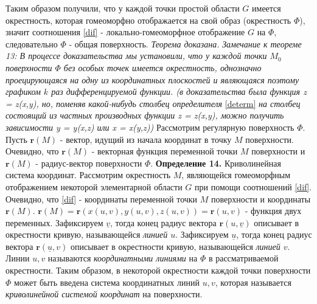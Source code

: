 \documentclass[12pt,a4paper]{article}
\begin{document}
	Таким образом получили, что у каждой точки простой области $G$ имеется окрестность, которая гомеоморфно отображается на свой образ (окрестность $\Phi$), значит соотношения \eqref{dif} - локально-гомеоморфное отображение $G$ на $\Phi$, следовательно $\Phi$ - общая поверхность. \textit{Теорема доказана.}
	\newline
	\newline
	\textit{Замечание к теореме 13: В процессе доказательства мы установили, что у каждой точки $M_{0}$ поверхности $\Phi$ без особых точек имеется окрестность, однозначно проецирующаяся на одну из координатных плоскостей и являющаяся поэтому графиком $k$ раз дифференцируемой функции. (в доказательства была функция z = z(x,y), но, поменяв какой-нибудь столбец определителя} \eqref{determ} \textit{на столбец состоящий из частных производных функции z = z(x,y), можно получить зависимости y = y(x,z) или x = x(y,z))}
	\newline
	\newline
	Рассмотрим регулярную поверхность $\Phi$. Пусть $\textbf{r}(M)$ - вектор, идущий из начала координат в точку $M$ поверхности. Очевидно, что $\textbf{r}(M)$ - векторная функция переменной точки $M$ поверхности и $\textbf{r}(M)$ - радиус-вектор поверхности $\Phi$.
	\newline
	\newline
	\textbf{Определение 14.} Криволинейная система координат.
	\newline
	Рассмотрим окрестность $M$, являющейся гомеоморфным отображением некоторой элементарной области $G$ при помощи соотношений \eqref{dif}. Очевидно, что \eqref{dif} - координаты переменной точки $M$ поверхности и координаты $\textbf{r}(M)$.
	\newline
	$\textbf{r}(M) = \textbf{r}(x(u,v), y(u,v), z(u,v)) = \textbf{r}(u,v)$ - функция двух переменных.
	\newline
	Зафиксируем $\underline{v}$, тогда конец радиус вектора $\textbf{r}(u,\underline{v})$ описывает в окрестности кривую, называющейся \textit{линией $u$}.
	\newline
	Зафиксируем $\underline{u}$, тогда конец радиус вектора $\textbf{r}(\underline{u},v)$ описывает в окрестности кривую, называющейся \textit{линией $v$}.
	\newline
	Линии $u, v$ называются \textit{координатными линиями} на $\Phi$ в рассматриваемой окрестности. Таким образом, в некоторой окрестности каждой точки поверхности $\Phi$ может быть введена система координатных линий $u, v$, которая называется \textit{криволинейной системой координат} на поверхности.
\end{document}
